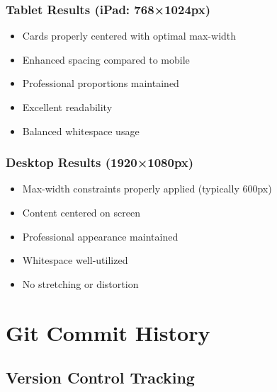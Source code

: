 \documentclass[11pt, a4paper]{report}
\begin{document}
\subsection{Tablet Results (iPad: 768×1024px)}

\begin{itemize}
    \item Cards properly centered with optimal max-width
    \item Enhanced spacing compared to mobile
    \item Professional proportions maintained
    \item Excellent readability
    \item Balanced whitespace usage
\end{itemize}

\subsection{Desktop Results (1920×1080px)}

\begin{itemize}
    \item Max-width constraints properly applied (typically 600px)
    \item Content centered on screen
    \item Professional appearance maintained
    \item Whitespace well-utilized
    \item No stretching or distortion
\end{itemize}

\chapter{Git Commit History}

\section{Version Control Tracking}
\end{document}
